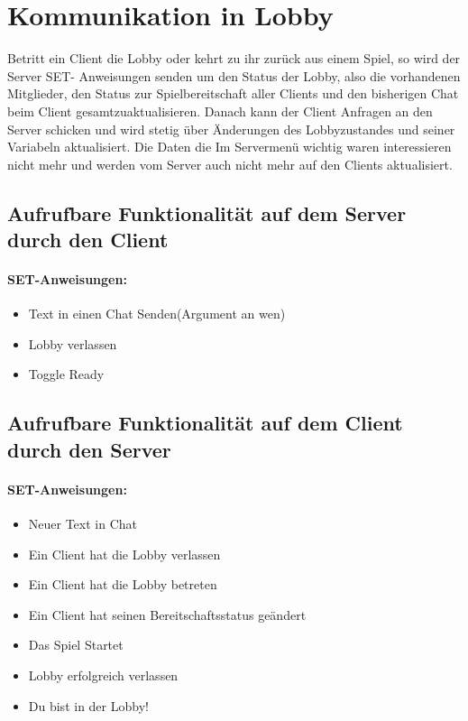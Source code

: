 \documentclass[a4paper, 12pt, oneside, headsepline=.5pt,footsepline=.5pt]{scrartcl}
\begin{document}
\section{Kommunikation in Lobby}
Betritt ein Client die Lobby oder kehrt zu ihr zurück aus einem Spiel, so wird der Server SET- Anweisungen senden um den Status der Lobby, also die vorhandenen Mitglieder, den Status zur Spielbereitschaft aller Clients und den bisherigen Chat beim Client gesamtzuaktualisieren. Danach kann der Client Anfragen an den Server schicken und wird stetig über Änderungen des Lobbyzustandes und seiner Variabeln aktualisiert. Die Daten die Im Servermenü wichtig waren interessieren nicht mehr und werden vom Server auch nicht mehr auf den Clients aktualisiert.

\subsection{Aufrufbare Funktionalität auf dem Server durch den Client}

\paragraph{\textbf SET-Anweisungen:}
\begin{itemize}
\item Text in einen Chat Senden(Argument an wen)
\item Lobby verlassen
\item Toggle Ready
\end{itemize}


\subsection{Aufrufbare Funktionalität auf dem Client durch den Server}

\paragraph{\textbf SET-Anweisungen:}
\begin{itemize}
\item Neuer Text in Chat
\item Ein Client hat die Lobby verlassen
\item Ein Client hat die Lobby betreten
\item Ein Client hat seinen Bereitschaftsstatus geändert
\item Das Spiel Startet 
\item Lobby erfolgreich verlassen
\item Du bist in der Lobby!
\end{itemize}
\end{document}
